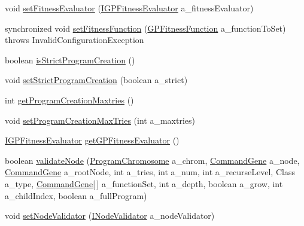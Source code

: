 \begin{DoxyCompactItemize}
void \hyperlink{classorg_1_1jgap_1_1gp_1_1impl_1_1_g_p_configuration_a5032240fbdcefc5e0072d8a79d3c9c4d}{set\-Fitness\-Evaluator} (\hyperlink{interfaceorg_1_1jgap_1_1gp_1_1_i_g_p_fitness_evaluator}{I\-G\-P\-Fitness\-Evaluator} a\-\_\-fitness\-Evaluator)
\item 
synchronized void \hyperlink{classorg_1_1jgap_1_1gp_1_1impl_1_1_g_p_configuration_a859fe224b8e5275c30302fa84cc1c9af}{set\-Fitness\-Function} (\hyperlink{classorg_1_1jgap_1_1gp_1_1_g_p_fitness_function}{G\-P\-Fitness\-Function} a\-\_\-function\-To\-Set)  throws Invalid\-Configuration\-Exception 
\item 
boolean \hyperlink{classorg_1_1jgap_1_1gp_1_1impl_1_1_g_p_configuration_a2481dc8d0914a7de8873da46d4acf25d}{is\-Strict\-Program\-Creation} ()
\item 
void \hyperlink{classorg_1_1jgap_1_1gp_1_1impl_1_1_g_p_configuration_a578c85e5d71b446c8e22838ed4f0cd74}{set\-Strict\-Program\-Creation} (boolean a\-\_\-strict)
\item 
int \hyperlink{classorg_1_1jgap_1_1gp_1_1impl_1_1_g_p_configuration_aed88c4f594dbc8cd66c9f5e4f3dcab50}{get\-Program\-Creation\-Maxtries} ()
\item 
void \hyperlink{classorg_1_1jgap_1_1gp_1_1impl_1_1_g_p_configuration_a0a0ab0092846d9e939e774d39461142f}{set\-Program\-Creation\-Max\-Tries} (int a\-\_\-maxtries)
\item 
\hyperlink{interfaceorg_1_1jgap_1_1gp_1_1_i_g_p_fitness_evaluator}{I\-G\-P\-Fitness\-Evaluator} \hyperlink{classorg_1_1jgap_1_1gp_1_1impl_1_1_g_p_configuration_a762e81e572849d407b1d7a96697dadf2}{get\-G\-P\-Fitness\-Evaluator} ()
\item 
boolean \hyperlink{classorg_1_1jgap_1_1gp_1_1impl_1_1_g_p_configuration_a54af1a43cc4c4b0cb84879bb5f6b0eaf}{validate\-Node} (\hyperlink{classorg_1_1jgap_1_1gp_1_1impl_1_1_program_chromosome}{Program\-Chromosome} a\-\_\-chrom, \hyperlink{classorg_1_1jgap_1_1gp_1_1_command_gene}{Command\-Gene} a\-\_\-node, \hyperlink{classorg_1_1jgap_1_1gp_1_1_command_gene}{Command\-Gene} a\-\_\-root\-Node, int a\-\_\-tries, int a\-\_\-num, int a\-\_\-recurse\-Level, Class a\-\_\-type, \hyperlink{classorg_1_1jgap_1_1gp_1_1_command_gene}{Command\-Gene}\mbox{[}$\,$\mbox{]} a\-\_\-function\-Set, int a\-\_\-depth, boolean a\-\_\-grow, int a\-\_\-child\-Index, boolean a\-\_\-full\-Program)
\item 
void \hyperlink{classorg_1_1jgap_1_1gp_1_1impl_1_1_g_p_configuration_a1ad9257423817cd8d34184f3daba9d01}{set\-Node\-Validator} (\hyperlink{interfaceorg_1_1jgap_1_1gp_1_1_i_node_validator}{I\-Node\-Validator} a\-\_\-node\-Validator)

\end{DoxyCompactItemize}

